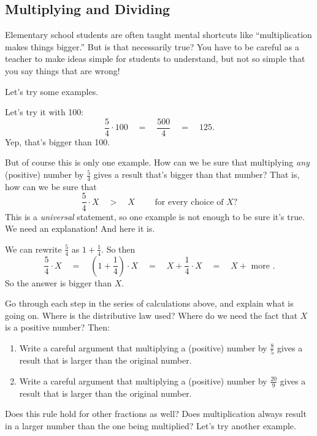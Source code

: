 \subsection{Multiplying and Dividing}
Elementary school students are often taught mental shortcuts like ``multiplication makes things bigger.''  But is that necessarily true?  You have to be careful as a teacher to make ideas simple for students to understand, but not so simple that you say things that are wrong!

Let's try some examples.

\begin{example}
Let's try it with 100:
\[
\frac 5 4 \cdot 100 
\quad
= 
\quad
\frac{500}4 
\quad
= 
\quad
125.
\]
Yep, that's bigger than 100.  
\end{example}

But of course this is only one example.  How can we be sure that multiplying \emph{any}  (positive)  number by $\frac 5 4$ gives a result that's bigger than that number?  That is, how can we be sure that
\[
\frac 5 4 \cdot X
\quad
 > 
 \quad
 X \qquad \text{ for every choice of } X?
\]
This is a \emph{universal} statement, so one example is not enough to be sure it's true.  We need an explanation!  And here it is.

We can rewrite $\frac 54$ as $1 + \frac 14$.  So then
\[
\frac 5 4 \cdot X 
\quad
=
\quad
\left(1 + \frac 1 4\right)\cdot X
\quad
=
\quad
X + \frac 1 4 \cdot X 
\quad 
=
\quad
X + \text{ more }.
\]
So the answer is bigger than $X$.

\begin{thinkpair*}
Go through each step in the series of calculations above, and explain what is going on.  Where is the distributive law used?  Where do we need the fact that $X$ is a positive number?  Then:
\begin{enumerate}
\item
Write a careful argument that multiplying a (positive) number by $\frac 8 5$ gives a result that is larger than the original number.\\
\item
 Write a careful argument that multiplying a (positive) number by $\frac {20} 9$ gives a result that is larger than the original number.\\
 \end{enumerate}

\end{thinkpair*}

Does this rule hold for other fractions as well?  Does multiplication always result in a larger number than the one being multiplied?  Let's try another example.


